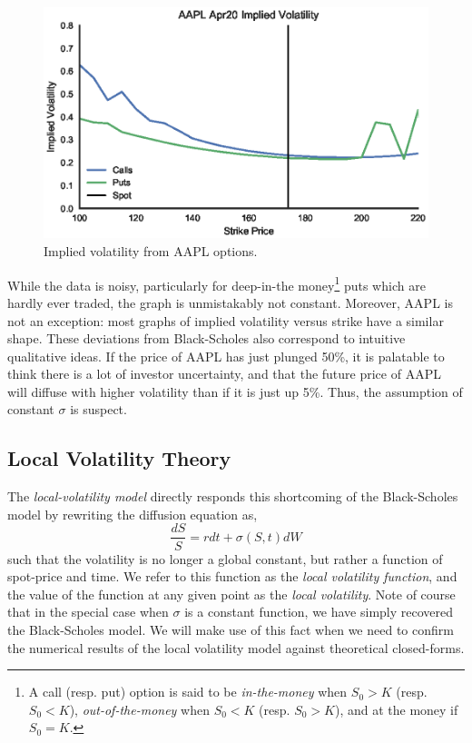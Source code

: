 \documentclass[12pt]{article}
\numberwithin{equation}{section}
\begin{document}
\begin{figure}[h]
\centering
\includegraphics{figs/aapliv}
\caption{Implied volatility from AAPL options.}
\label{fig:aapliv}
\end{figure}

While the data is noisy, particularly for deep-in-the money\footnote{A call
(resp. put) option is said to be \emph{in-the-money} when $S_0 > K$ (resp. $S_0
< K$), \emph{out-of-the-money} when $S_0 < K$ (resp. $S_0 > K$), and at the
money if $S_0 = K$.} puts which are hardly ever traded, the graph is
unmistakably not constant. Moreover, AAPL is not an exception: most graphs of
implied volatility versus strike have a similar shape. These deviations from
Black-Scholes also correspond to intuitive qualitative ideas. If the price of
AAPL has just plunged 50\%, it is palatable to think there is a lot of investor
uncertainty, and that the future price of AAPL will diffuse with higher
volatility than if it is just up 5\%.  Thus, the assumption of constant $\sigma$
is suspect.

\subsection{Local Volatility Theory}
\label{sec:localvoltheory}

The \emph{local-volatility model} directly responds this shortcoming of the
Black-Scholes model by rewriting the diffusion equation as,
\begin{equation}
 \frac{dS}{S} = r dt + \sigma(S,t) dW 
\end{equation}
such that the volatility is no longer a global constant, but rather a function
of spot-price and time. We refer to this function as the \emph{local volatility
function}, and the value of the function at any given point as the \emph{local
volatility}. Note of course that in the special case when $\sigma$ is a constant
function, we have simply recovered the Black-Scholes model. We will make use of
this fact when we need to confirm the numerical results of the local volatility
model against theoretical closed-forms.
\end{document}
